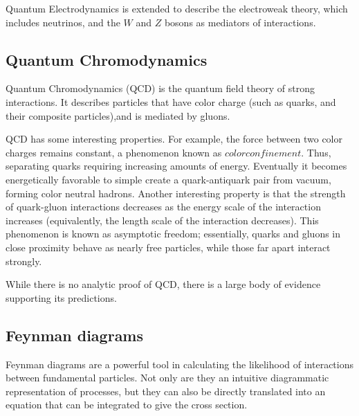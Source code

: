 \documentclass[11pt,a4paper]{report}
\begin{document}
Quantum Electrodynamics is extended to describe the electroweak theory, which includes neutrinos, and the $W$ and $Z$ bosons as mediators of interactions.

\subsection{Quantum Chromodynamics}
Quantum Chromodynamics (QCD) is the quantum field theory of strong interactions. It describes particles that have color charge (such as quarks, and their composite particles),and is mediated by gluons.

QCD has some interesting properties. For example, the force between two color charges remains constant, a phenomenon known as $color confinement$. Thus, separating quarks requiring increasing amounts of energy. Eventually it becomes energetically favorable to simple create a quark-antiquark pair from vacuum, forming color neutral hadrons. Another interesting property is that the strength of quark-gluon interactions decreases as the energy scale of the interaction increases (equivalently, the length scale of the interaction decreases). This phenomenon is known as asymptotic freedom; essentially, quarks and gluons in close proximity behave as nearly free particles, while those far apart interact strongly.

While there is no analytic proof of QCD, there is a large body of evidence supporting its predictions.

\subsection{Feynman diagrams}
Feynman diagrams are a powerful tool in calculating the likelihood of interactions between fundamental particles. Not only are they an intuitive diagrammatic representation of processes, but they can also be directly translated into an equation that can be integrated to give the cross section.
\end{document}
